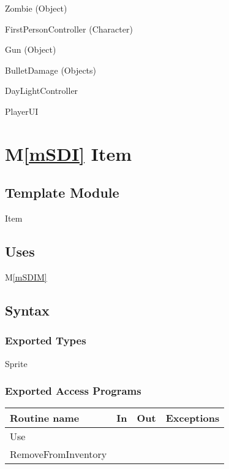 \documentclass[12pt]{article}
\newcounter{mnum}
\newcommand{\mthemnum}{M\themnum}
\newcommand{\mref}[1]{M\ref{#1}}
\begin{document}
\begin{description}
\item [ \mthemnum \label{mBHZ}:] Zombie (Object)
\item [ \mthemnum \label{mBHFPS}:] FirstPersonController (Character)
\item [ \mthemnum \label{mBHG}:] Gun (Object)
\item [ \mthemnum \label{mBHBD}:] BulletDamage (Objects)
{\color{magenta} \item [\refstepcounter{mnum} \mthemnum \label{mBHDLC}:] DayLightController}
{\color{magenta} \item [\refstepcounter{mnum} \mthemnum \label{mBHPU}:] PlayerUI}
\end{description}

\section* {\mref{mSDI} Item}

\subsection*{Template Module}

Item

\subsection* {Uses}

\mref{mSDIM}

\subsection* {Syntax}

\subsubsection* {Exported Types}

Sprite

\subsubsection* {Exported Access Programs}

\begin{tabular}{| l | l | l | l |}
\hline
\textbf{Routine name} & \textbf{In} & \textbf{Out} & \textbf{Exceptions}\\
\hline
Use & ~ & ~ & ~\\
\hline
RemoveFromInventory & ~ & ~ & ~\\
\hline
\end{tabular}
\end{document}
